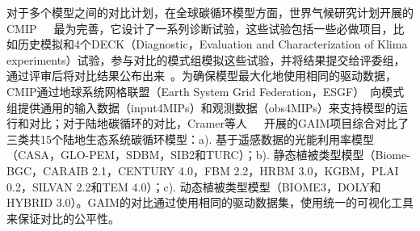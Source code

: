 
对于多个模型之间的对比计划，在全球碳循环模型方面，世界气候研究计划开展的CMIP~\cite{meehl2000coupled}~\cite{Taylor2012An}~\cite{eyring2016overview}最为完善，它设计了一系列诊断试验，这些试验包括一些必做项目，比如历史模拟和4个DECK（Diagnostic，Evaluation and Characterization of Klima experiments）试验，参与对比的模式组模拟这些试验，并将结果提交给评委组，通过评审后将对比结果公布出来~\cite{赵宗慈2016CMIP6}。为确保模型最大化地使用相同的驱动数据，CMIP通过地球系统网格联盟（Earth System Grid Federation，ESGF）~\cite{williams2011earth}向模式组提供通用的输入数据（input4MIPs）和观测数据（obs4MIPs）来支持模型的运行和对比；对于陆地碳循环的对比，Cramer等人~\cite{cramer1999comparing}~\cite{kicklighter1999comparing}~\cite{bondeau1999comparing}开展的GAIM项目综合对比了三类共15个陆地生态系统碳循环模型：a). 基于遥感数据的光能利用率模型（CASA，GLO-PEM，SDBM，SIB2和TURC）；b). 静态植被类型模型（Biome-BGC，CARAIB 2.1，CENTURY 4.0，FBM 2.2，HRBM 3.0，KGBM，PLAI 0.2，SILVAN 2.2和TEM 4.0）；c). 动态植被类型模型（BIOME3，DOLY和HYBRID 3.0）。GAIM的对比通过使用相同的驱动数据集，使用统一的可视化工具来保证对比的公平性。





